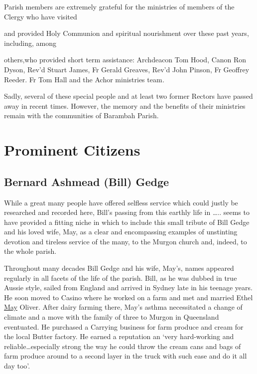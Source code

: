 Parish members are extremely grateful for the ministries of members of
the Clergy who have visited

and provided Holy Communion and spiritual nourishment over these past
years, including, among

others,who provided short term assistance: Archdeacon Tom Hood, Canon
Ron Dyson, Rev'd Stuart James, Fr Gerald Greaves, Rev'd John Pinson, Fr
Geoffrey Reeder. Fr Tom Hall and the Achor ministries team\emph{.}

Sadly, several of these special people and at least two former Rectors
have passed away in recent times. However, the memory and the benefits
of their ministries remain with the communities of Barambah Parish.

\hypertarget{prominent-citizens}{%
\chapter{Prominent Citizens}\label{prominent-citizens}}

\hypertarget{bernard-ashmead-bill-gedge}{%
\section{Bernard Ashmead (Bill)
Gedge}\label{bernard-ashmead-bill-gedge}}

While a great many people have offered selfless service which could
justly be researched and recorded here, Bill's passing from this earthly
life in \ldots.. seems to have provided a fitting niche in which to
include this small tribute of Bill Gedge and his loved wife, May, as a
clear and encompassing examples of unstinting devotion and tireless
service of the many, to the Murgon church and, indeed, to the whole
parish.

Throughout many decades Bill Gedge and his wife, May's, names appeared
regularly in all facets of the life of the parish. Bill, as he was
dubbed in true Aussie style, sailed from England and arrived in Sydney
late in his teenage years. He soon moved to Casino where he worked on a
farm and met and married Ethel \underline{May} Oliver. After dairy
farming there, May's asthma necessitated a change of climate and a move
with the family of three to Murgon in Queensland eventuated. He
purchased a Carrying business for farm produce and cream for the local
Butter factory. He earned a reputation an `very hard-working and
reliable\ldots especially strong the way he could throw the cream cans
and bags of farm produce around to a second layer in the truck with such
ease and do it all day too'.

